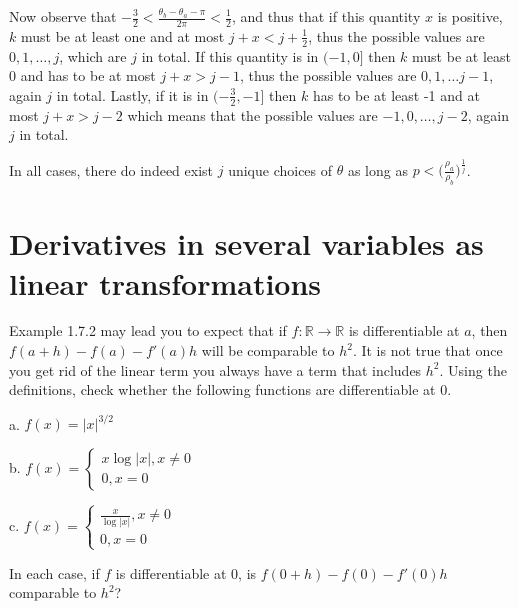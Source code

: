 \begin{solution}
    Now observe that $-\frac{3}{2} < \frac{\theta_b - \theta_a - \pi}{2\pi} < \frac{1}{2}$, and thus that if this quantity $x$ is positive, $k$ must be at least one and at most $j + x <j + \frac{1}{2}$, thus the possible values are $0, 1, \ldots, j$, which are $j$ in total. If this quantity is in $(-1, 0]$ then $k$ must be at least 0 and has to be at most $j + x > j - 1$, thus the possible values are $0, 1, \ldots j - 1$, again $j$ in total. Lastly, if it is in $(-\frac{3}{2}, -1]$ then $k$ has to be at least -1 and at most $j + x > j - 2$ which means that the possible values are $-1, 0, \ldots, j -2$, again $j$ in total.

    In all cases, there do indeed exist $j$ unique choices of $\theta$ as long as $p < \bigl(\frac{\rho_a}{\rho_b}\bigr)^{\frac{1}{j}}$.
\end{solution} 

\section{Derivatives in several variables as linear transformations}

\begin{exercise}{4}
    Example 1.7.2 may lead you to expect that if $f: \mathbb{R} \rightarrow \mathbb{R}$ is differentiable at $a$, then $f(a+h) - f(a) - f'(a)h$ will be comparable to $h^2$. It is not true that once you get rid of the linear term you always have a term that includes $h^2$. Using the definitions, check whether the following functions are differentiable at $0$.

    a. $f(x) = \lvert x \rvert^{3/2}$

    b. $f(x) = \begin{cases} x\log \lvert x \rvert, x \neq 0 \\ 0, x = 0\end{cases}$

    c. $f(x) = \begin{cases}
        \frac{x}{\log \lvert x \rvert}, x \neq 0 \\
        0, x = 0 \end{cases}$

    In each case, if $f$ is differentiable at 0, is $f(0+h) - f(0) - f'(0)h$ comparable to $h^2$?
\end{exercise}

